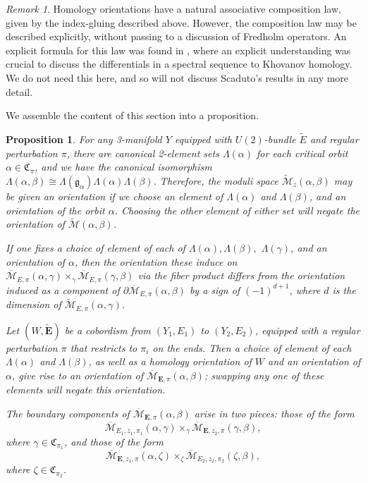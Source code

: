 \documentclass{memo-l}
\newtheorem{proposition}[theorem]{Proposition}
\theoremstyle{definition}
\theoremstyle{remark}
\newtheorem{remark}[theorem]{Remark}
\numberwithin{section}{chapter}
\numberwithin{equation}{chapter}
\begin{document}
\begin{remark}Homology orientations have a natural associative composition law, given by the index-gluing described above. However, the composition law may be described explicitly, without passing to a discussion of Fredholm operators. An explicit formula for this law was found in \cite{scaduto2015instantons}, where an explicit understanding was crucial to discuss the differentials in a spectral sequence to Khovanov homology. We do not need this here, and so will not discuss Scaduto's results in any more detail.
\end{remark}

We assemble the content of this section into a proposition.

\begin{proposition}\label{orientations}For any 3-manifold $Y$ equipped with $U(2)$-bundle $\tilde E$ and regular perturbation $\pi$, there are canonical 2-element sets $\Lambda(\alpha)$ for each critical orbit $\alpha \in \mathfrak C_\pi$, and we have the canonical isomorphism $\Lambda(\alpha, \beta) \cong \Lambda(\mathfrak g_\alpha)\Lambda(\alpha) \Lambda(\beta)$. Therefore, the moduli space $\widetilde{\mathcal M}_z(\alpha, \beta)$ may be given an orientation if we choose an element of $\Lambda(\alpha)$ and $\Lambda(\beta)$, and an orientation of the orbit $\alpha$. Choosing the other element of either set will negate the orientation of $\widetilde{\mathcal M}(\alpha, \beta)$.

If one fixes a choice of element of each of $\Lambda(\alpha), \Lambda(\beta), $ $\Lambda(\gamma)$, and an orientation of $\alpha$, then the orientation these induce on $\overline{\mathcal M}_{E,\pi}(\alpha, \gamma) \times_{\gamma} \overline{\mathcal M}_{E,\pi}(\gamma, \beta)$ via the fiber product differs from the orientation induced as a component of $\partial \overline{\mathcal M}_{E,\pi}(\alpha, \beta)$ by a sign of $(-1)^{d+1}$, where $d$ is the dimension of $\widetilde{\mathcal M}_{E,\pi}(\alpha, \gamma)$. 

Let $(W,\widetilde{\mathbf{E}})$ be a cobordism from $(Y_1, E_1)$ to $(Y_2, E_2)$, equipped with a regular perturbation $\pi$ that restricts to $\pi_i$ on the ends. Then a choice of element of each $\Lambda(\alpha)$ and $\Lambda(\beta)$, as well as a homology orientation of $W$ and an orientation of $\alpha$, give rise to an orientation of $\overline{\mathcal M}_{\mathbf{E},\pi}(\alpha, \beta)$; swapping any one of these elements will negate this orientation.

The boundary components of $\overline{\mathcal M}_{\mathbf{E},\pi}(\alpha, \beta)$ arise in two pieces: those of the form 
$$\overline{\mathcal M}_{E_1,z_1,\pi_1}(\alpha, \gamma) \times_\gamma \overline{\mathcal M}_{\mathbf{E},z_2,\pi}(\gamma, \beta),$$ 
where $\gamma \in \mathfrak C_{\pi_1}$, and those of the form 
$$\overline{\mathcal M}_{\mathbf{E},z_1,\pi}(\alpha, \zeta) \times_\zeta \overline{\mathcal M}_{E_2, z_2, \pi_2}(\zeta, \beta),$$ 
where $\zeta \in \mathfrak C_{\pi_2}$.


\end{proposition}
\end{document}
